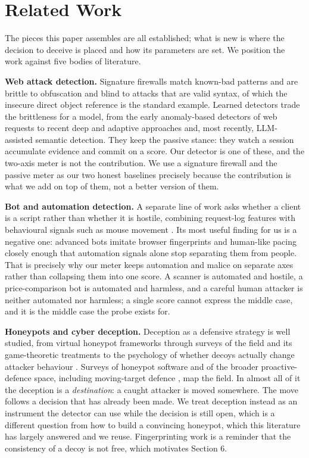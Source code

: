 
\section{Related Work}

The pieces this paper assembles are all established; what is new is where the
decision to deceive is placed and how its parameters are set. We position the work
against five bodies of literature.

\textbf{Web attack detection.} Signature firewalls match known-bad patterns and are
brittle to obfuscation and blind to attacks that are valid syntax, of which the
insecure direct object reference is the standard example. Learned detectors trade
the brittleness for a model, from the early anomaly-based detectors of web
requests \cite{kruegel2003anomaly} to recent deep and
adaptive approaches \cite{tekerek2021novel,amouei2022rat} and, most recently,
LLM-assisted semantic detection. They keep the passive stance: they watch a
session accumulate evidence and commit on a score. Our detector is one of these, and the
two-axis meter is not the contribution. We use a signature firewall and
the passive meter as our two honest baselines precisely because the contribution
is what we add on top of them, not a better version of them.

\textbf{Bot and automation detection.} A separate line of work asks whether a client
is a script rather than whether it is hostile, combining request-log features with
behavioural signals such as mouse movement \cite{iliou2019towards,iliou2021detection}.
Its most useful finding for us is a negative one: advanced bots imitate browser
fingerprints and human-like pacing closely enough that automation signals alone stop
separating them from people. That is precisely why our meter keeps automation and
malice on separate axes rather than collapsing them into one score. A scanner is
automated and hostile, a price-comparison bot is automated and harmless, and a
careful human attacker is neither automated nor harmless; a single score cannot
express the middle case, and it is the middle case the probe exists for.

\textbf{Honeypots and cyber deception.} Deception as a defensive strategy is well
studied, from virtual honeypot frameworks \cite{provos2004honeyd} through surveys
of the field and its game-theoretic treatments
\cite{han2018deception,beltran2025cyberdeception}
to the psychology of whether decoys actually change attacker behaviour
\cite{fergusonwalter2021examining,barron2017picky}. Surveys of honeypot software \cite{javadpour2024survey} and of
the broader proactive-defence space, including moving-target defence
\cite{cho2020mtd}, map the field. In almost all of it the deception is a
\emph{destination}: a caught attacker is moved somewhere. The move follows a decision
that has already been made. We treat deception instead as an
instrument the detector can use while the decision is still open, which is a
different question from how to build a convincing honeypot, which this
literature has largely answered and we reuse. Fingerprinting work
\cite{vetterl2018bitter,srinivasa2020honeytoken} is a reminder that the
consistency of a decoy is not free, which motivates Section 6.

